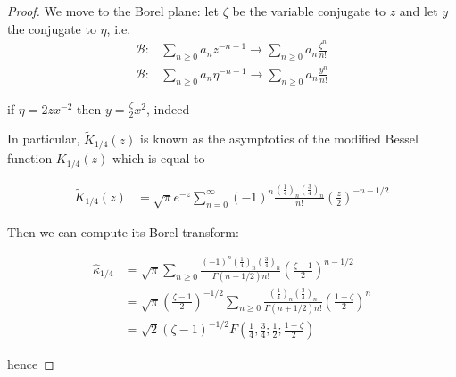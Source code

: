 \documentclass{article}
\theoremstyle{definition}
\theoremstyle{plain}
\begin{document}
\begin{proof}
We move to the Borel plane: let $\zeta$ be the variable conjugate to $z$ and let $y$ the conjugate to $\eta$, i.e.
\begin{align*}
\mathcal{B}\colon & \sum_{n\geq 0}a_nz^{-n-1}\to \sum_{n\geq 0}a_n\frac{\zeta^n}{n!}\\
\mathcal{B}\colon&\sum_{n\geq 0}a_n\eta^{-n-1}\to \sum_{n\geq 0}a_n\frac{y^n}{n!}
\end{align*} 

if $\eta=2zx^{-2}$ then $y=\frac{\zeta}{2}x^2$, indeed 



In particular, $\tilde{K}_{1/4}(z)$ is known as the asymptotics of the modified Bessel function $K_{1/4}(z)$ which is equal to 

\begin{align*}
\tilde{K}_{1/4}(z)&=\sqrt{\pi}e^{-z}\sum_{n= 0}^{\infty}(-1)^n\frac{\left(\frac{1}{4}\right)_n\left(\frac{3}{4}\right)_n}{n!}\left(\frac{z}{2}\right)^{-n-1/2}
\end{align*}

Then we can compute its Borel transform: 

\begin{align*}
\hat{\kappa}_{1/4}&=\sqrt{\pi}\sum_{n\geq 0}\frac{(-1)^n\left(\frac{1}{4}\right)_n\left(\frac{3}{4}\right)_n}{\Gamma(n+1/2) n!}\left(\frac{\zeta-1}{2}\right)^{n-1/2}\\
&=\sqrt{\pi}\left(\frac{\zeta-1}{2}\right)^{-1/2}\sum_{n\geq 0}\frac{\left(\frac{1}{4}\right)_n\left(\frac{3}{4}\right)_n}{\Gamma(n+1/2) n!}\left(\frac{1-\zeta}{2}\right)^{n}\\
&=\sqrt{2}(\zeta-1)^{-1/2}F\left(\frac{1}{4},\frac{3}{4};\frac{1}{2};\frac{1-\zeta}{2}\right)
\end{align*}

hence 


\end{proof}
\end{document}
